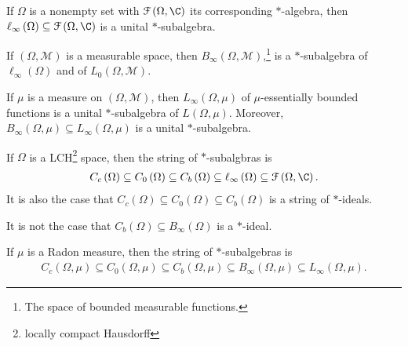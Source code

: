 \documentclass[10pt]{mypackage}
\begin{document}
\begin{example}
  If $\Omega$ is a nonempty set with $\mathcal{F}\left(\Omega,\C\right)$ its corresponding $\ast$-algebra, then $\ell_{\infty}\left(\Omega\right)\subseteq \mathcal{F}\left(\Omega,\C\right)$ is a unital $\ast$-subalgebra.\newline

  If $\left(\Omega,\mathcal{M}\right)$ is a measurable space, then $B_{\infty}\left(\Omega,\mathcal{M}\right)$,\footnote{The space of bounded measurable functions.} is a $\ast$-subalgebra of $\ell_{\infty}\left(\Omega\right)$ and of $L_0\left(\Omega,\mathcal{M}\right)$.\newline

  If $\mu$ is a measure on $\left(\Omega,\mathcal{M}\right)$, then $L_{\infty}\left(\Omega,\mu\right)$ of $\mu$-essentially bounded functions is a unital $\ast$-subalgebra of $L\left(\Omega,\mu\right)$. Moreover, $B_{\infty}\left(\Omega,\mu\right)\subseteq L_{\infty}\left(\Omega,\mu\right)$ is a unital $\ast$-subalgebra.\newline
  
  If $\Omega$ is a LCH\footnote{locally compact Hausdorff} space, then the string of $\ast$-subalgbras is
  \begin{align*}
    C_c\left(\Omega\right)\subseteq C_0\left(\Omega\right)\subseteq C_b\left(\Omega\right)\subseteq\ell_{\infty}\left(\Omega\right)\subseteq \mathcal{F}\left(\Omega,\C\right).
  \end{align*}
  It is also the case that $C_c\left(\Omega\right)\subseteq C_0\left(\Omega\right)\subseteq C_b\left(\Omega\right)$ is a string of $\ast$-ideals.\newline

  It is not the case that $C_b\left(\Omega\right)\subseteq B_{\infty}\left(\Omega\right)$ is a $\ast$-ideal.\newline

  If $\mu$ is a Radon measure, then the string of $\ast$-subalgebras is
  \begin{align*}
    C_c\left(\Omega,\mu\right) \subseteq C_0\left(\Omega,\mu\right)\subseteq C_b\left(\Omega,\mu\right) \subseteq B_{\infty}\left(\Omega,\mu\right)\subseteq L_{\infty}\left(\Omega,\mu\right).
  \end{align*}
\end{example}
\end{document}
